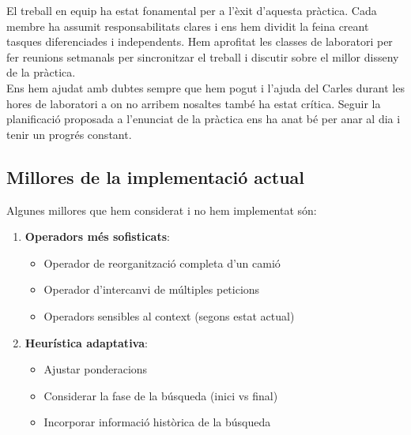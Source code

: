 El treball en equip ha estat fonamental per a l'èxit d'aquesta pràctica. Cada membre ha assumit responsabilitats clares i ens hem dividit la feina creant tasques diferenciades i independents. Hem aprofitat les classes de laboratori per fer reunions setmanals per sincronitzar el treball i discutir sobre el millor disseny de la pràctica. \\

Ens hem ajudat amb dubtes sempre que hem pogut i l'ajuda del Carles durant les hores de laboratori a on no arribem nosaltes també ha estat crítica. 
Seguir la planificació proposada a l'enunciat de la pràctica ens ha anat bé per anar al dia i tenir un progrés constant.

\subsection{Millores de la implementació actual}
Algunes millores que hem considerat i no hem implementat són:

\begin{enumerate}
    \item \textbf{Operadors més sofisticats}:
    \begin{itemize}
        \item Operador de reorganització completa d'un camió
        \item Operador d'intercanvi de múltiples peticions
        \item Operadors sensibles al context (segons estat actual)
    \end{itemize}
    
    \item \textbf{Heurística adaptativa}:
    \begin{itemize}
        \item Ajustar ponderacions
        \item Considerar la fase de la búsqueda (inici vs final)
        \item Incorporar informació històrica de la búsqueda
    \end{itemize}
\end{enumerate}


